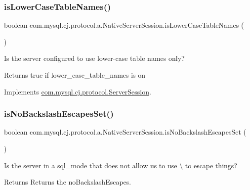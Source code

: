 \subsubsection{\texorpdfstring{is\+Lower\+Case\+Table\+Names()}{isLowerCaseTableNames()}}
{\footnotesize\ttfamily boolean com.\+mysql.\+cj.\+protocol.\+a.\+Native\+Server\+Session.\+is\+Lower\+Case\+Table\+Names (\begin{DoxyParamCaption}{ }\end{DoxyParamCaption})}

Is the server configured to use lower-\/case table names only?

\begin{DoxyReturn}{Returns}
true if lower\+\_\+case\+\_\+table\+\_\+names is \textquotesingle{}on\textquotesingle{} 
\end{DoxyReturn}


Implements \mbox{\hyperlink{interfacecom_1_1mysql_1_1cj_1_1protocol_1_1_server_session_a48d31222ed61fa5971aae698a5ff9fdf}{com.\+mysql.\+cj.\+protocol.\+Server\+Session}}.

\mbox{\label{classcom_1_1mysql_1_1cj_1_1protocol_1_1a_1_1_native_server_session_a649bec25ec5ac1c5084be7be5008844e}} 
\subsubsection{\texorpdfstring{is\+No\+Backslash\+Escapes\+Set()}{isNoBackslashEscapesSet()}}
{\footnotesize\ttfamily boolean com.\+mysql.\+cj.\+protocol.\+a.\+Native\+Server\+Session.\+is\+No\+Backslash\+Escapes\+Set (\begin{DoxyParamCaption}{ }\end{DoxyParamCaption})}

Is the server in a sql\+\_\+mode that does not allow us to use \textbackslash{} to escape things?

\begin{DoxyReturn}{Returns}
Returns the no\+Backslash\+Escapes. 
\end{DoxyReturn}


